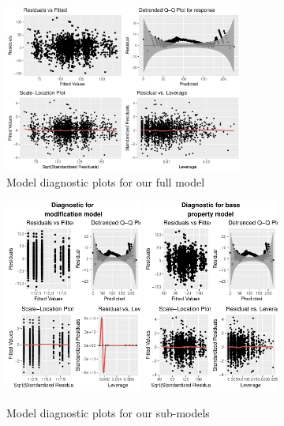 \documentclass[9pt]{extarticle}
\begin{document}
\begin{figure}[H]
	\centering
	\includegraphics[width=0.7\textwidth]{fm_diag}
	\caption{Model diagnostic plots for our full model}
	\label{fig:fmdiag}
\end{figure}

\begin{figure}[H]
	\centering
	\includegraphics[width=0.4\textwidth]{diag_modif}
	\includegraphics[width=0.4\textwidth]{diag_prop}
	\caption{Model diagnostic plots for our sub-models}
	\label{fig:smdiag}
\end{figure}
\end{document}
